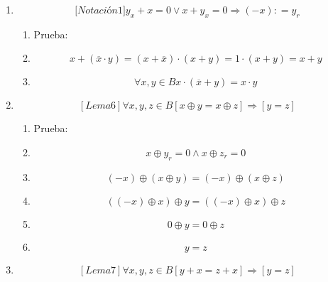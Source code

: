 \begin{enumerate}
\begin{enumerate}
\begin{enumerate}
\begin{enumerate}
        \begin{enumerate}
        \def\labelenumv{\arabic{enumv}.}
        \tightlist
        \item
          Prueba:
        \item
          \[y_{r} \oplus {\left( {x \oplus z_{r}} \right) = y_{r}} \oplus 0\]
        \item
          \[\left( {y_{r} \oplus x} \right) \oplus {z_{r} = y_{r}}\]
        \item
          \[0 \oplus {z_{r} = y_{r}}\]
        \item
          \[z_{r} = y_{r}\]
        \end{enumerate}
      \item
        \[{\lbrack{{Notación}1}\rbrack}{{{y_{x} + x} = {{0 \vee x} + y_{x}}} = 0}\Rightarrow\left( {- x} \right){: = y_{r}}\]

        \begin{enumerate}
        \def\labelenumv{\arabic{enumv}.}
        \tightlist
        \item
          Prueba:
        \item
          \[{{{x + {({\overline{x} \cdot y})}} = {{({x + \overline{x}})} \cdot {({x + y})}}} = {1 \cdot {({x + y})}}} = {x + y}\]
        \item
          \[\forall x,{y \in B}{{x \cdot {({\overline{x} + y})}} = {x \cdot y}}\]
        \end{enumerate}
      \item
        \[\left\lbrack {{Lema}6} \right\rbrack\forall x,y,{z \in B}\left\lbrack {x \oplus {y = x} \oplus z} \right\rbrack\Rightarrow\left\lbrack {y = z} \right\rbrack\]

        \begin{enumerate}
        \def\labelenumv{\arabic{enumv}.}
        \tightlist
        \item
          Prueba:
        \item
          \[x \oplus {y_{r} = {0 \land x}} \oplus {z_{r} = 0}\]
        \item
          \[{({- x})} \oplus {{({x \oplus y})} = {({- x})}} \oplus {({x \oplus z})}\]
        \item
          \[\left( {{({- x})} \oplus x} \right) \oplus {y = \left( {{({- x})} \oplus x} \right)} \oplus z\]
        \item
          \[0 \oplus {y = 0} \oplus z\]
        \item
          \[y = z\]
        \end{enumerate}
      \item
        \[\left\lbrack {{Lema}7} \right\rbrack\forall x,y,{z \in B}\left\lbrack {{y + x} = {z + x}} \right\rbrack\Rightarrow\left\lbrack {y = z} \right\rbrack\]


\end{enumerate}
\end{enumerate}
\end{enumerate}
\end{enumerate}
